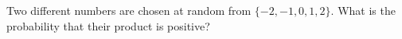 Two different numbers are chosen at random from $\{-2,-1,0,1,2\}$. What is the probability that their product is positive?
